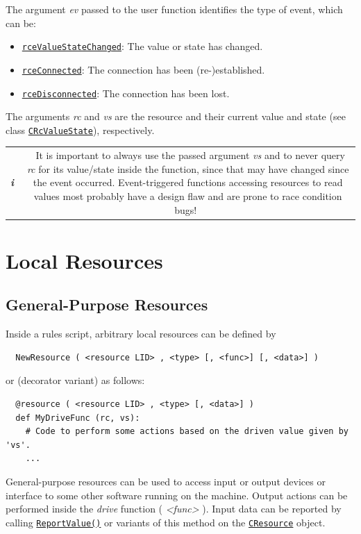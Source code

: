 \documentclass[12pt,english,parskip=half,headheight=19pt]{scrreprt}
\newcommand{\infobox}[1]{
  \par
  \medskip
  \hfill
  \setlength\arrayrulewidth{1pt}
  \begin{tabular}[t]{c|c|}
    \parbox{1.8em}{\hfill\textit{\Huge\textbf{i}\,}}
    &
    \,\parbox{0.89\linewidth}{\setlength{\parskip}{0.5em} \small #1}\,
  \end{tabular}
  \medskip
  \par
}
\newcommand{\refapic}[1]{\href{home2l-api_c/index.html}{\mbox{\texttt{#1}}}}            %
\newcommand{\refapipython}[1]{\href{home2l-api_python/index.html}{\mbox{\texttt{#1}}}}  %
\begin{document}
The argument \textit{ev} passed to the user function identifies the type of event, which can be:
\begin{itemize}
  \item \refapic{rceValueStateChanged}: The value or state has changed.
  \item \refapic{rceConnected}: The connection has been (re-)established.
  \item \refapic{rceDisconnected}: The connection has been lost.
\end{itemize}
The arguments \textit{rc} and \textit{vs} are the resource and their current value and state (see class \refapic{CRcValueState}), respectively.

\infobox{
  It is important to always use the passed argument \textit{vs} and to never query \textit{rc}
  for its value/state inside the function, since that may have changed since the event
  occurred. Event-triggered functions accessing resources to read values most probably have a
  design flaw and are prone to race condition bugs!
}



\section{Local Resources}
\label{sec:rules-resources}



\subsection{General-Purpose Resources}

Inside a rules script, arbitrary local resources can be defined by
\begin{lstlisting}
  NewResource ( <resource LID> , <type> [, <func>] [, <data>] )
\end{lstlisting}
or (decorator variant) as follows:
\begin{lstlisting}
  @resource ( <resource LID> , <type> [, <data>] )
  def MyDriveFunc (rc, vs):
    # Code to perform some actions based on the driven value given by 'vs'.
    ...
\end{lstlisting}

General-purpose resources can be used to access input or output devices or interface to some other software running on the machine. Output actions can be performed inside the \textit{drive} function ( \textit{<func>} ). Input data can be reported by calling \refapipython{ReportValue()} or variants of this method on the \refapipython{CResource} object.
\end{document}
